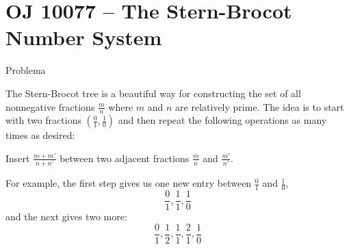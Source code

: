 \section{OJ 10077 -- The Stern-Brocot Number System}

\begin{frame}[fragile]{Problema}

The Stern-Brocot tree is a beautiful way for constructing the set of all nonnegative fractions 
$\frac{m}{n}$ where $m$ and $n$ are relatively prime. The idea is to start with two fractions 
$(\frac{0}{1}, \frac{1}{0})$ and then repeat the following operations as many times as desired:

\begin{center}
Insert $\frac{m+m'}{n+n'}$ between two adjacent fractions $\frac{m}{n}$ and $\frac{m'}{n'}$. 
\end{center}

For example, the first step gives us one new entry between $\frac{0}{1}$ and $\frac{1}{0}$,
\[
    \frac{0}{1}, \frac{1}{1}, \frac{1}{0}
\]
and the next gives two more:
\[
    \frac{0}{1}, \frac{1}{2}, \frac{1}{1}, \frac{2}{1},\frac{1}{0}
\]

\end{frame}

